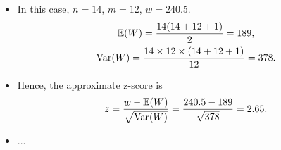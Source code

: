 \begin{frame}[fragile]
\begin{itemize}
	\item[] In this case, $n=14$,  $m=12$,  $w=240.5$.
	\begin{gather*}
		\mathbb{E}(W) = \frac{14(14+12+1)}{2} = 189,\\
		\text{Var}(W) = \frac{14\times 12 \times (14+12+1)}{12} = 378.
	\end{gather*}
	\item[] Hence, the approximate z-score is
	\begin{align*}
		z = \frac{w-\mathbb{E}(W)}{\sqrt{\text{Var}(W)}} = \frac{240.5-189}{\sqrt{378}} = 2.65.
	\end{align*}
	\item[]...\myQED
\end{itemize}
\end{frame}
